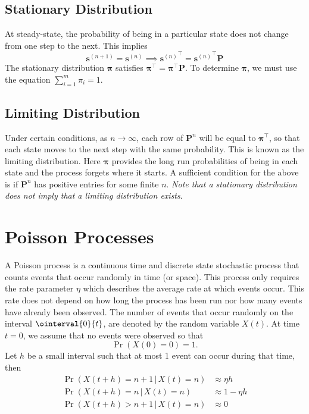 \documentclass{article}
\begin{document}
\subsection{Stationary Distribution}
At steady-state, the probability of being in a particular state does
not change from one step to the next. This implies
\begin{equation*}
    \symbf{s}^{\left( n+1 \right)} = \symbf{s}^{\left( n \right)} \implies {\symbf{s}^{\left( n \right)}}^\top = {\symbf{s}^{\left( n \right)}}^\top \symbf{P}
\end{equation*}
The stationary distribution \(\symbf{\pi}\) satisfies \(\symbf{\pi}^\top = \symbf{\pi}^\top \symbf{P}\).
To determine \(\symbf{\pi}\), we must use the equation \(\sum_{i = 1}^m \pi_i = 1\).
\subsection{Limiting Distribution}
Under certain conditions, as \(n \to \infty\), each row of
\(\symbf{P}^n\) will be equal to \(\symbf{\pi}^\top\), so that each
state moves to the next step with the same probability. This is known
as the limiting distribution. Here \(\symbf{\pi}\) provides the long
run probabilities of being in each state and the process forgets where
it starts. A sufficient condition for the above is if \(\symbf{P}^n\)
has positive entries for some finite \(n\). \textit{Note that a
stationary distribution does not imply that a limiting distribution
exists}.
\section{Poisson Processes}
A Poisson process is a continuous time and discrete state stochastic
process that counts events that occur randomly in time (or space). This
process only requires the rate parameter \(\eta\) which describes the
average rate at which events occur. This rate does not depend on how
long the process has been run nor how many events have already been
observed. The number of events that occur randomly on the interval
\(\ointerval{0}{t}\), are denoted by the random variable \(X\left( t
\right)\). At time \(t = 0\), we assume that no events were observed so
that
\begin{equation*}
    \Pr{\left( X\left( 0 \right) = 0 \right)} = 1.
\end{equation*}
Let \(h\) be a small interval such that at most 1 event can occur during that time, then
\begin{align*}
    \Pr{\left( X\left( t + h \right) = n + 1 \,\vert\, X\left( t \right) = n \right)} & \approx \eta h     \\
    \Pr{\left( X\left( t + h \right) = n \,\vert\, X\left( t \right) = n \right)}     & \approx 1 - \eta h \\
    \Pr{\left( X\left( t + h \right) > n + 1 \,\vert\, X\left( t \right) = n \right)} & \approx 0
\end{align*}
\end{document}
